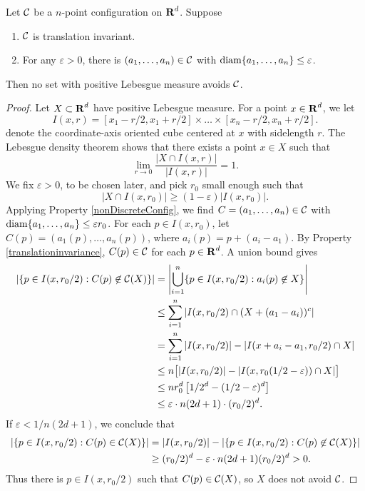 \begin{theorem}
	Let $\operatorname{\mathcal{C}}$ be a $n$-point configuration on $\operatorname{\mathbf{R}}^d$. Suppose
	\begin{enumerate}
		\item \label{translationinvariance} $\operatorname{\mathcal{C}}$ is translation invariant.
		\item \label{nonDiscreteConfig} For any $\varepsilon > 0$, there is $(a_1, \dots, a_n) \in \operatorname{\mathcal{C}}$ with $\operatorname{\text{diam}} \{ a_1, \dots, a_n \} \leq \varepsilon$.
	\end{enumerate}
	Then no set with positive Lebesgue measure avoids $\operatorname{\mathcal{C}}$.
\end{theorem}
\begin{proof}
	Let $X \subset \operatorname{\mathbf{R}}^d$ have positive Lebesgue measure. For a point $x \in \operatorname{\mathbf{R}}^d$, we let
	\[ I(x,r) = [x_1 - r/2, x_1 + r/2] \times \dots \times [x_n - r/2, x_n + r/2]. \]
	denote the coordinate-axis oriented cube centered at $x$ with sidelength $r$. The Lebesgue density theorem shows that there exists a point $x \in X$ such that
	\[ \lim_{r \to 0} \frac{|X \cap I(x,r)|}{|I(x,r)|} = 1. \]
	We fix $\varepsilon > 0$, to be chosen later, and pick $r_0$ small enough such that
	\[ |X \cap I(x,r_0)| \geq (1 - \varepsilon)|I(x,r_0)|. \]
	Applying Property \ref{nonDiscreteConfig}, we find $C = (a_1, \dots, a_n) \in \operatorname{\mathcal{C}}$ with $\operatorname{\text{diam}} \{ a_1, \dots, a_n \} \leq \varepsilon r_0$. For each $p \in I(x,r_0)$, let $C(p) = (a_1(p), \dots, a_n(p))$, where $a_i(p) = p + (a_i - a_1)$. By Property \ref{translationinvariance}, $C(p) \in \operatorname{\mathcal{C}}$ for each $p \in \operatorname{\mathbf{R}}^d$. A union bound gives
	\begin{align*}
		\left| \{ p \in I(x,r_0/2) : C(p) \not \in \operatorname{\mathcal{C}}(X) \} \right| &= \left| \bigcup_{i = 1}^n \{ p \in I(x,r_0/2) : a_i(p) \not \in X \} \right|\\
		&\leq \sum_{i = 1}^n |I(x,r_0/2) \cap (X + (a_1 - a_i))^c|\\
		&= \sum_{i = 1}^n |I(x,r_0/2)| - |I(x+a_i-a_1,r_0/2) \cap X|\\
		&\leq n \big[ |I(x,r_0/2)| - |I(x,r_0(1/2 - \varepsilon)) \cap X| \big]\\
		&\leq n r_0^d \left[ 1/2^d - (1/2 - \varepsilon)^d \right] \\
		&\leq \varepsilon \cdot n (2d + 1) \cdot (r_0/2)^d.
	\end{align*}
	If $\varepsilon < 1/n(2d + 1)$, we conclude that
	\begin{align*}
		\left|\left\{ p \in I(x,r_0/2): C(p) \in \operatorname{\mathcal{C}}(X) \right\}\right| &= |I(x,r_0/2)| - \left| \left\{ p \in I(x,r_0/2): C(p) \not \in \operatorname{\mathcal{C}}(X) \right\} \right|\\
		&\geq (r_0/2)^d - \varepsilon \cdot n(2d + 1) (r_0/2)^d > 0.
	\end{align*}
	Thus there is $p \in I(x,r_0/2)$ such that $C(p) \in \operatorname{\mathcal{C}}(X)$, so $X$ does not avoid $\operatorname{\mathcal{C}}$.
\end{proof}


